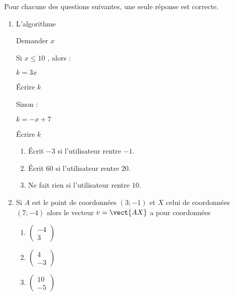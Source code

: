 
\begin{exercice}\label{exosmath-0630}

    Pour chacune des questions suivantes, une seule réponse est correcte.
    \begin{multicols}{2}
    \begin{enumerate}
        \item
           L'algorithme

    \begin{fmpage}{0.9\linewidth}

        Demander \( x\)

    Si  \( x\leq 10\) , alors :

    \hspace{0.5cm} \( k=3x\)

    \hspace{0.5cm} Écrire \( k\) 

    Sinon :

    \hspace{0.5cm} \( k=-x+7\)

    \hspace{0.5cm} Écrire \( k\) 

\end{fmpage}

    \begin{enumerate}
        \item
            Écrit \( -3\) si l'utilisateur rentre \( -1\).
        \item
            Écrit \( 60 \) si l'utilisateur rentre \( 20\).
        \item
            Ne fait rien si l'utilisateur rentre \( 10\).
    \end{enumerate}
    
\item

    Si \( A\) est le point de coordonnées \( (3;-1)\) et \( X\) celui de coordonnées \( (7;-4)\) alors le vecteur \( v=\vect{ AX }\) a pour coordonnées
    \begin{enumerate}
        \item
            \( \begin{pmatrix}
                -4    \\ 
                3    
            \end{pmatrix}\)
        \item
            \( \begin{pmatrix}
                4    \\ 
                -3    
            \end{pmatrix}\)
        \item
            \( \begin{pmatrix}
                10    \\ 
                -5    
            \end{pmatrix}\)
    \end{enumerate}
    

\end{enumerate}
\end{multicols}
\end{exercice}
